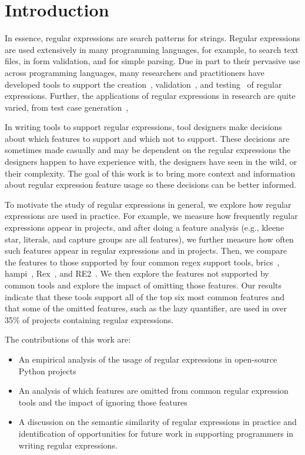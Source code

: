 \section{Introduction}

 In essence, regular expressions are search patterns for strings. Regular expressions are used extensively in many programming languages, for example, to search text files, in form validation, and for simple parsing. Due in part to their pervasive use across programming languages, many researchers and practitioners have developed tools to support the creation~\cite{}, validation~\cite{}, and testing~\cite{} of regular expressions. Further, the applications of regular expressions in research  are quite varied, from test case generation~\cite{Ghosh:2013:JAT:2486788.2486925, Galler:2014:STD:2683035.2683100}, 

 In writing tools to support regular expressions, tool designers make decisions about which features to support and which not to support. These decisions are sometimes made casually and may be dependent on the regular expressions the designers happen to have experience with, the designers have seen in the wild, or their complexity. The goal of this work is to bring more context and information about regular expression feature usage so these decisions can be better informed. 

To motivate the study of regular expressions in general, we explore how regular expressions are used in practice. For example, we measure how frequently regular expressions appear in projects, and after doing a feature analysis (e.g., kleene star, literals, and capture groups are all features), we further measure how often such features appear in regular expressions and in projects. Then, we compare the features to those supported by four common regex support tools, brics~\cite{brics}, hampi~\cite{hampi}, Rex~\cite{rex}, and RE2~\cite{}. We then explore the features not supported by common tools and explore the impact of omitting those features. Our results indicate that these tools support all of the top six most common features and that some of the omitted features, such as the lazy quantifier, are used in over 35\% of projects containing regular expressions.

The contributions of this work are:

\begin{itemize}
	\item An empirical analysis of the usage of regular expressions in  open-source Python projects
	\item An analysis of which features are omitted from common regular expression tools and the impact of ignoring those features
	\item A discussion on the semantic similarity of regular expressions in practice and identification of opportunities for future work in supporting programmers in writing regular expressions.
\end{itemize}

